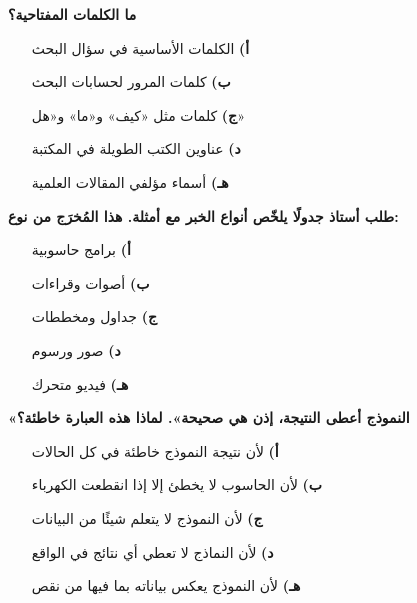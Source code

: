 \documentclass[11pt,a4paper]{article}
\begin{document}
\begin{multicols}{2}
\begin{minipage}{\linewidth}
\hangindent=0.7cm\textbf{ما الكلمات المفتاحية؟}
\begin{itemize}[leftmargin=0.95cm, labelsep=4pt, itemsep=0pt, topsep=2pt, parsep=0pt]
  \item[\textbf{أ)}] الكلمات الأساسية في سؤال البحث
  \item[\textbf{ب)}] كلمات المرور لحسابات البحث
  \item[\textbf{ج)}] كلمات مثل «كيف» و«ما» و«هل»
  \item[\textbf{د)}] عناوين الكتب الطويلة في المكتبة
  \item[\textbf{هـ)}] أسماء مؤلفي المقالات العلمية
\end{itemize}
\end{minipage}\par\vspace{7pt plus 4pt}
\noindent\begin{minipage}{\linewidth}
\hangindent=0.7cm\textbf{طلب أستاذ جدولًا يلخّص أنواع الخبر مع أمثلة. هذا المُخرَج من نوع:}
\begin{itemize}[leftmargin=0.95cm, labelsep=4pt, itemsep=0pt, topsep=2pt, parsep=0pt]
  \item[\textbf{أ)}] برامج حاسوبية
  \item[\textbf{ب)}] أصوات وقراءات
  \item[\textbf{ج)}] جداول ومخططات
  \item[\textbf{د)}] صور ورسوم
  \item[\textbf{هـ)}] فيديو متحرك
\end{itemize}
\end{minipage}\par\vspace{7pt plus 4pt}
\noindent\begin{minipage}{\linewidth}
\hangindent=0.7cm\textbf{«النموذج أعطى النتيجة، إذن هي صحيحة». لماذا هذه العبارة خاطئة؟}
\begin{itemize}[leftmargin=0.95cm, labelsep=4pt, itemsep=0pt, topsep=2pt, parsep=0pt]
  \item[\textbf{أ)}] لأن نتيجة النموذج خاطئة في كل الحالات
  \item[\textbf{ب)}] لأن الحاسوب لا يخطئ إلا إذا انقطعت الكهرباء
  \item[\textbf{ج)}] لأن النموذج لا يتعلم شيئًا من البيانات
  \item[\textbf{د)}] لأن النماذج لا تعطي أي نتائج في الواقع
  \item[\textbf{هـ)}] لأن النموذج يعكس بياناته بما فيها من نقص

\end{itemize}
\end{minipage}
\end{multicols}
\end{document}
